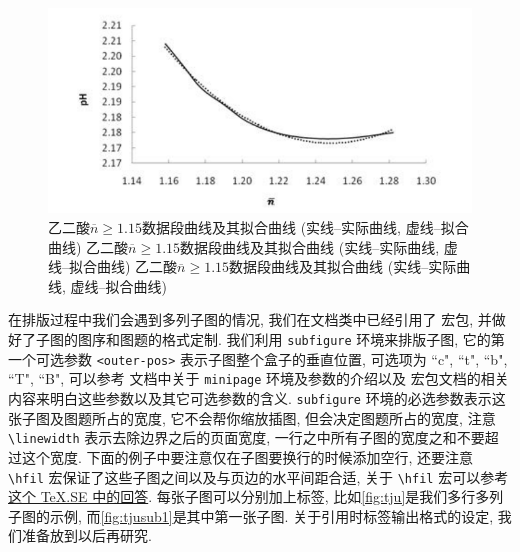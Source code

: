 \begin{figure}[htbp]
  \centering
  \includegraphics{figures/oxalic-acid-n-geq-1.15.pdf}
  \caption{乙二酸$\overline{n}\geq 1.15$数据段曲线及其拟合曲线 (实线--实际曲线, 虚线--拟合曲线) 乙二酸$\overline{n}\geq 1.15$数据段曲线及其拟合曲线 (实线--实际曲线, 虚线--拟合曲线) 乙二酸$\overline{n}\geq 1.15$数据段曲线及其拟合曲线 (实线--实际曲线, 虚线--拟合曲线)}\label{fig:xlccd-single}
\end{figure}

在排版过程中我们会遇到多列子图的情况, 我们在文档类中已经引用了  宏包, 并做好了子图的图序和图题的格式定制. 我们利用 \verb|subfigure| 环境来排版子图, 它的第一个可选参数 \verb|<outer-pos>| 表示子图整个盒子的垂直位置, 可选项为 ``c", ``t", ``b", ``T", ``B", 可以参考  文档中关于 \verb|minipage| 环境及参数的介绍以及  宏包文档的相关内容来明白这些参数以及其它可选参数的含义. \verb|subfigure| 环境的必选参数表示这张子图及图题所占的宽度, 它不会帮你缩放插图, 但会决定图题所占的宽度, 注意\verb|\linewidth| 表示去除边界之后的页面宽度, 一行之中所有子图的宽度之和不要超过这个宽度. 下面的例子中要注意仅在子图要换行的时候添加空行, 还要注意 \verb|\hfil| 宏保证了这些子图之间以及与页边的水平间距合适, 关于 \verb|\hfil| 宏可以参考\href{https://tex.stackexchange.com/a/528921/184559}{这个 TeX.SE 中的回答}. 每张子图可以分别加上标签, 比如\ref{fig:tju}是我们多行多列子图的示例, 而\ref{fig:tjusub1}是其中第一张子图. 关于引用时标签输出格式的设定, 我们准备放到以后再研究.

